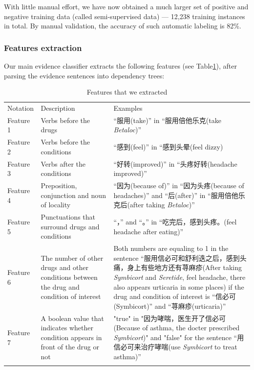 With little manual effort, we have now obtained a much larger set 
of positive and negative training data (called semi-supervised data) --- 
12,238 training instances in total. By manual validation, the accuracy of such 
automatic labeling is 82\%.

\subsubsection{Features extraction}
\label{subsubsec:2.3.2}
Our main evidence classifier extracts the following features (see Table\ref{tab:2.1}), after parsing the evidence sentences into dependency trees:

\begin{table}
	\centering
	\caption{Features that we extracted}
	\label{tab:2.1}       %
	\begin{tabular}{m{1.2cm}m{5cm}m{4cm}}
		\hline\noalign{\smallskip}
		Notation & Description & Examples \\
		\noalign{\smallskip}\hline\noalign{\smallskip}
		Feature 1 & Verbs before the drugs & “服用(take)” in “服用倍他乐克(take \textit{Betaloc})” \\
		Feature 2 & Verbs before the conditions & “感到(feel)” in “感到头晕(feel dizzy) \\
		Feature 3 & Verbs after the conditions & “好转(improved)” in “头疼好转(headache improved)” \\
		Feature 4 & Preposition, conjunction and noun of locality & “因为(because of)” in “因为头疼(because of headaches)” and “后(after)” in “服用倍他乐克后(after taking \textit{Betaloc})” \\
		Feature 5 & Punctuations that surround drugs and conditions & “，” and “。” in “吃完后，感到头疼。(feel headache after eating)” \\
		Feature 6 & The number of other drugs and other conditions between the drug and condition of interest & Both numbers are equaling to 1 in the sentence “服用信必可和舒利迭之后，感到头痛，身上有些地方还有荨麻疹(After taking \textit{Symbicort} and \textit{Seretide}, feel headache, there also appears urticaria in some places) if the drug and condition of interest is “信必可(Symbicort)” and “荨麻疹(urticaria)” \\
		Feature 7 & A boolean value that indicates whether condition appears in front of the drug or not & "true" in "因为哮喘，医生开了信必可(Because of asthma, the docter prescribed \textit{Symbicort})" and "false" for the sentence “用信必可来治疗哮喘(use \textit{Symbicort} to treat asthma)”\\
		\noalign{\smallskip}\hline
	\end{tabular}
\end{table}

